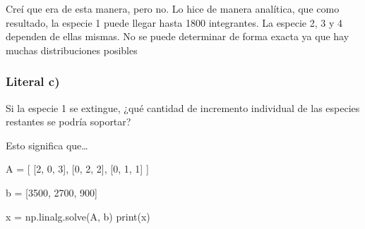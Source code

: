 \documentclass[
  letterpaper,
  DIV=11,
  numbers=noendperiod]{scrartcl}
\newenvironment{Shaded}{\begin{snugshade}}{\end{snugshade}}
\newcommand{\BuiltInTok}[1]{\textcolor[rgb]{0.00,0.23,0.31}{#1}}
\newcommand{\DecValTok}[1]{\textcolor[rgb]{0.68,0.00,0.00}{#1}}
\newcommand{\NormalTok}[1]{\textcolor[rgb]{0.00,0.23,0.31}{#1}}
\newcommand{\OperatorTok}[1]{\textcolor[rgb]{0.37,0.37,0.37}{#1}}
\begin{document}
Creí que era de esta manera, pero no. Lo hice de manera analítica, que
como resultado, la especie 1 puede llegar hasta 1800 integrantes. La
especie 2, 3 y 4 dependen de ellas mismas. No se puede determinar de
forma exacta ya que hay muchas distribuciones posibles

\subsubsection{Literal c)}\label{literal-c-4}

Si la especie 1 se extingue, ¿qué cantidad de incremento individual de
las especies restantes se podría soportar?

Esto significa que\ldots{}

\begin{Shaded}
\begin{Highlighting}[]

\NormalTok{A }\OperatorTok{=}\NormalTok{ [}
\NormalTok{    [}\DecValTok{2}\NormalTok{, }\DecValTok{0}\NormalTok{, }\DecValTok{3}\NormalTok{],}
\NormalTok{    [}\DecValTok{0}\NormalTok{, }\DecValTok{2}\NormalTok{, }\DecValTok{2}\NormalTok{],}
\NormalTok{    [}\DecValTok{0}\NormalTok{, }\DecValTok{1}\NormalTok{, }\DecValTok{1}\NormalTok{]}
\NormalTok{]}

\NormalTok{b }\OperatorTok{=}\NormalTok{ [}\DecValTok{3500}\NormalTok{, }\DecValTok{2700}\NormalTok{, }\DecValTok{900}\NormalTok{]}

\NormalTok{x }\OperatorTok{=}\NormalTok{ np.linalg.solve(A, b)}
\BuiltInTok{print}\NormalTok{(x)}
\end{Highlighting}
\end{Shaded}
\end{document}
